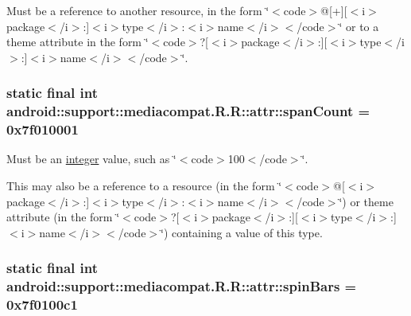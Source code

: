 Must be a reference to another resource, in the form \char`\"{}$<$code$>$@\mbox{[}+\mbox{]}\mbox{[}$<$i$>$package$<$/i$>$:\mbox{]}$<$i$>$type$<$/i$>$:$<$i$>$name$<$/i$>$$<$/code$>$\char`\"{} or to a theme attribute in the form \char`\"{}$<$code$>$?\mbox{[}$<$i$>$package$<$/i$>$:\mbox{]}\mbox{[}$<$i$>$type$<$/i$>$:\mbox{]}$<$i$>$name$<$/i$>$$<$/code$>$\char`\"{}. \hypertarget{classandroid_1_1support_1_1mediacompat_1_1_r_1_1attr_3910ebcddd591824dd25c1de1619a613}{
\subsubsection[{spanCount}]{\setlength{\rightskip}{0pt plus 5cm}static final int android::support::mediacompat.R.R::attr::spanCount = 0x7f010001}}
\label{classandroid_1_1support_1_1mediacompat_1_1_r_1_1attr_3910ebcddd591824dd25c1de1619a613}


Must be an \hyperlink{classandroid_1_1support_1_1mediacompat_1_1_r_1_1integer}{integer} value, such as \char`\"{}$<$code$>$100$<$/code$>$\char`\"{}. 

This may also be a reference to a resource (in the form \char`\"{}$<$code$>$@\mbox{[}$<$i$>$package$<$/i$>$:\mbox{]}$<$i$>$type$<$/i$>$:$<$i$>$name$<$/i$>$$<$/code$>$\char`\"{}) or theme attribute (in the form \char`\"{}$<$code$>$?\mbox{[}$<$i$>$package$<$/i$>$:\mbox{]}\mbox{[}$<$i$>$type$<$/i$>$:\mbox{]}$<$i$>$name$<$/i$>$$<$/code$>$\char`\"{}) containing a value of this type. \hypertarget{classandroid_1_1support_1_1mediacompat_1_1_r_1_1attr_d6813905142295ef6df1cce6128cb84c}{
\subsubsection[{spinBars}]{\setlength{\rightskip}{0pt plus 5cm}static final int android::support::mediacompat.R.R::attr::spinBars = 0x7f0100c1}}
\label{classandroid_1_1support_1_1mediacompat_1_1_r_1_1attr_d6813905142295ef6df1cce6128cb84c}


